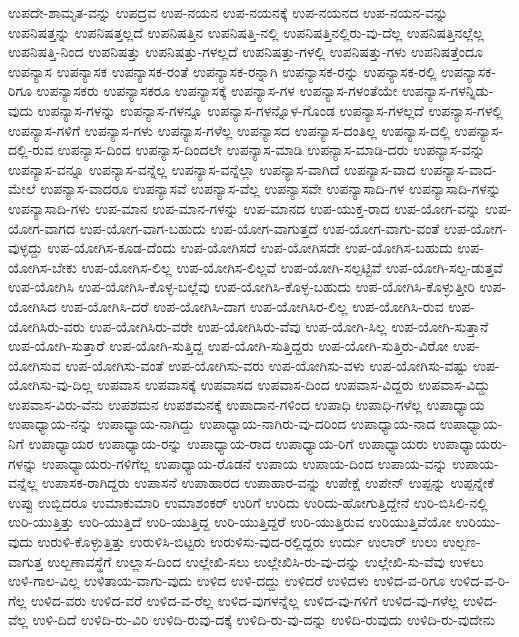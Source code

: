 {ಉಪದೇ-ಶಾಮೃತ-ವನ್ನು
ಉಪದ್ರವ
ಉಪ-ನಯನ
ಉಪ-ನಯನಕ್ಕೆ
ಉಪ-ನಯನದ
ಉಪ-ನಯನ-ವನ್ನು
ಉಪನಿಷತ್ತನ್ನು
ಉಪನಿಷತ್ತಲ್ಲದೆ
ಉಪನಿಷತ್ತಿನ
ಉಪನಿಷತ್ತಿ-ನಲ್ಲಿ
ಉಪನಿಷತ್ತಿನಲ್ಲಿರು-ವು-ದೆಲ್ಲ
ಉಪನಿಷತ್ತಿನಲ್ಲೆಲ್ಲ
ಉಪನಿಷತ್ತಿ-ನಿಂದ
ಉಪನಿಷತ್ತು
ಉಪನಿಷತ್ತು-ಗಳಲ್ಲದೆ
ಉಪನಿಷತ್ತು-ಗಳಲ್ಲಿ
ಉಪನಿಷತ್ತು-ಗಳು
ಉಪನಿಷತ್ತೆಂದೂ
ಉಪನ್ಯಾಸ
ಉಪನ್ಯಾಸಕ
ಉಪನ್ಯಾಸಕ-ರಂತೆ
ಉಪನ್ಯಾಸಕ-ರನ್ನಾಗಿ
ಉಪನ್ಯಾಸಕ-ರನ್ನು
ಉಪನ್ಯಾಸಕ-ರಲ್ಲಿ
ಉಪನ್ಯಾಸಕ-ರಿಗೂ
ಉಪನ್ಯಾಸಕರು
ಉಪನ್ಯಾಸಕರೂ
ಉಪನ್ಯಾಸಕ್ಕೆ
ಉಪನ್ಯಾಸ-ಗಳ
ಉಪನ್ಯಾಸ-ಗಳಂತೆಯೇ
ಉಪನ್ಯಾಸ-ಗಳನ್ನಿಡು-ವುದು
ಉಪನ್ಯಾಸ-ಗಳನ್ನು
ಉಪನ್ಯಾಸ-ಗಳನ್ನೂ
ಉಪನ್ಯಾಸ-ಗಳನ್ನೊಳ-ಗೊಂಡ
ಉಪನ್ಯಾಸ-ಗಳಲ್ಲದೆ
ಉಪನ್ಯಾಸ-ಗಳಲ್ಲಿ
ಉಪನ್ಯಾಸ-ಗಳಿಗೆ
ಉಪನ್ಯಾಸ-ಗಳು
ಉಪನ್ಯಾಸ-ಗಳೆಲ್ಲ
ಉಪನ್ಯಾಸದ
ಉಪನ್ಯಾಸ-ದಂತಿಲ್ಲ
ಉಪನ್ಯಾಸ-ದಲ್ಲಿ
ಉಪನ್ಯಾಸ-ದಲ್ಲಿ-ರುವ
ಉಪನ್ಯಾಸ-ದಿಂದ
ಉಪನ್ಯಾಸ-ದಿಂದಲೇ
ಉಪನ್ಯಾಸ-ಮಾಡಿ
ಉಪನ್ಯಾಸ-ಮಾಡಿ-ದರು
ಉಪನ್ಯಾಸ-ವನ್ನು
ಉಪನ್ಯಾಸ-ವನ್ನೂ
ಉಪನ್ಯಾಸ-ವನ್ನೆಲ್ಲ
ಉಪನ್ಯಾಸ-ವನ್ನೆಲ್ಲಾ
ಉಪನ್ಯಾಸ-ವಾಗಿದೆ
ಉಪನ್ಯಾಸ-ವಾದ
ಉಪನ್ಯಾಸ-ವಾದ-ಮೇಲೆ
ಉಪನ್ಯಾಸ-ವಾದರೂ
ಉಪನ್ಯಾಸವೆ
ಉಪನ್ಯಾಸ-ವೆಲ್ಲ
ಉಪನ್ಯಾಸವೇ
ಉಪನ್ಯಾಸಾದಿ-ಗಳ
ಉಪನ್ಯಾಸಾದಿ-ಗಳನ್ನು
ಉಪನ್ಯಾಸಾದಿ-ಗಳು
ಉಪ-ಮಾನ
ಉಪ-ಮಾನ-ಗಳನ್ನು
ಉಪ-ಮಾನದ
ಉಪ-ಯುಕ್ತ-ರಾದ
ಉಪ-ಯೋಗ-ವನ್ನು
ಉಪ-ಯೋಗ-ವಾಗದ
ಉಪ-ಯೋಗ-ವಾಗ-ಬಹುದು
ಉಪ-ಯೋಗ-ವಾಗುತ್ತದೆ
ಉಪ-ಯೋಗ-ವಾಗು-ವಂತೆ
ಉಪ-ಯೋಗ-ವುಳ್ಳದ್ದು
ಉಪ-ಯೋಗಿಸ-ಕೂಡ-ದೆಂದು
ಉಪ-ಯೋಗಿಸದೆ
ಉಪ-ಯೋಗಿಸದೇ
ಉಪ-ಯೋಗಿಸ-ಬಹುದು
ಉಪ-ಯೋಗಿಸ-ಬೇಕು
ಉಪ-ಯೋಗಿಸ-ಲಿಲ್ಲ
ಉಪ-ಯೋಗಿಸ-ಲಿಲ್ಲವೆ
ಉಪ-ಯೋಗಿ-ಸಲ್ಪಟ್ಟಿವೆ
ಉಪ-ಯೋಗಿ-ಸಲ್ಪ-ಡುತ್ತವೆ
ಉಪ-ಯೋಗಿಸಿ
ಉಪ-ಯೋಗಿಸಿ-ಕೊಳ್ಳ-ಬಲ್ಲೆವು
ಉಪ-ಯೋಗಿಸಿ-ಕೊಳ್ಳ-ಬಹುದು
ಉಪ-ಯೋಗಿಸಿ-ಕೊಳ್ಳುತ್ತೀರಿ
ಉಪ-ಯೋಗಿಸಿದ
ಉಪ-ಯೋಗಿಸಿ-ದರೆ
ಉಪ-ಯೋಗಿಸಿ-ದಾಗ
ಉಪ-ಯೋಗಿಸಿರ-ಲಿಲ್ಲ
ಉಪ-ಯೋಗಿಸಿ-ರುವ
ಉಪ-ಯೋಗಿಸಿರು-ವರು
ಉಪ-ಯೋಗಿಸಿರು-ವರೇ
ಉಪ-ಯೋಗಿಸಿರು-ವೆವು
ಉಪ-ಯೋಗಿ-ಸಿಲ್ಲ
ಉಪ-ಯೋಗಿ-ಸುತ್ತಾನೆ
ಉಪ-ಯೋಗಿ-ಸುತ್ತಾರೆ
ಉಪ-ಯೋಗಿ-ಸುತ್ತಿದ್ದ
ಉಪ-ಯೋಗಿ-ಸುತ್ತಿದ್ದರು
ಉಪ-ಯೋಗಿ-ಸುತ್ತಿರು-ವಿರೋ
ಉಪ-ಯೋಗಿಸುವ
ಉಪ-ಯೋಗಿಸು-ವಂತೆ
ಉಪ-ಯೋಗಿಸು-ವರು
ಉಪ-ಯೋಗಿಸು-ವಳು
ಉಪ-ಯೋಗಿಸು-ವಷ್ಟು
ಉಪ-ಯೋಗಿಸು-ವು-ದಿಲ್ಲ
ಉಪವಾಸ
ಉಪವಾಸಕ್ಕೆ
ಉಪವಾಸದ
ಉಪವಾಸ-ದಿಂದ
ಉಪವಾಸ-ವಿದ್ದರು
ಉಪವಾಸ-ವಿದ್ದು
ಉಪವಾಸ-ವಿರು-ವೆನು
ಉಪಶಮನ
ಉಪಶಮನಕ್ಕೆ
ಉಪಾದಾನ-ಗಳಿಂದ
ಉಪಾಧಿ
ಉಪಾಧಿ-ಗಳೆಲ್ಲ
ಉಪಾಧ್ಯಾಯ
ಉಪಾಧ್ಯಾಯ-ನನ್ನು
ಉಪಾಧ್ಯಾಯ-ನಾಗಿದ್ದು
ಉಪಾಧ್ಯಾಯ-ನಾಗಿರು-ವು-ದರಿಂದ
ಉಪಾಧ್ಯಾಯ-ನಾದ
ಉಪಾಧ್ಯಾಯ-ನಿಗೆ
ಉಪಾಧ್ಯಾಯರ
ಉಪಾಧ್ಯಾಯ-ರನ್ನು
ಉಪಾಧ್ಯಾಯ-ರಾದ
ಉಪಾಧ್ಯಾಯ-ರಿಗೆ
ಉಪಾಧ್ಯಾಯರು
ಉಪಾಧ್ಯಾಯರು-ಗಳನ್ನು
ಉಪಾಧ್ಯಾಯರು-ಗಳಿಗೆಲ್ಲ
ಉಪಾಧ್ಯಾಯ-ರೊಡನೆ
ಉಪಾಯ
ಉಪಾಯ-ದಿಂದ
ಉಪಾಯ-ವನ್ನು
ಉಪಾಯ-ವನ್ನೆಲ್ಲ
ಉಪಾಸಕ-ರಾಗಿದ್ದರು
ಉಪಾಸನೆ
ಉಪಾಹಾರದ
ಉಪಾಹಾರ-ವನ್ನು
ಉಪೇಕ್ಷೆ
ಉಪೇನ್
ಉಪ್ಪನ್ನು
ಉಪ್ಪನ್ನೇಕೆ
ಉಪ್ಪು
ಉಬ್ಬಿದರೂ
ಉಮಾಕುಮಾರಿ
ಉಮಾಶಂಕರ್
ಉರಿಗೆ
ಉರಿದು
ಉರಿದು-ಹೋಗುತ್ತಿದ್ದೇನೆ
ಉರಿ-ಬಿಸಿಲಿ-ನಲ್ಲಿ
ಉರಿ-ಯುತ್ತಿತ್ತು
ಉರಿ-ಯುತ್ತಿದೆ
ಉರಿ-ಯುತ್ತಿದ್ದ
ಉರಿ-ಯುತ್ತಿದ್ದರೆ
ಉರಿ-ಯುತ್ತಿರುವ
ಉರಿಯುತ್ತಿವೆಯೋ
ಉರಿಯು-ವುದು
ಉರುಳಿ-ಕೊಳ್ಳುತ್ತಿತ್ತು
ಉರುಳಿಸಿ-ಬಿಟ್ಟರು
ಉರುಳಿಸು-ವುದ-ರಲ್ಲಿದ್ದರು
ಉರ್ದು
ಉಲಾರ್
ಉಲು
ಉಲ್ಬಣ-ವಾಗುತ್ತ
ಉಲ್ಬಣಾವಸ್ಥೆಗೆ
ಉಲ್ಲಾಸ-ದಿಂದ
ಉಲ್ಲೇಖಿ-ಸಲು
ಉಲ್ಲೇಖಿಸಿ-ರು-ವು-ದನ್ನು
ಉಲ್ಲೇಖಿ-ಸು-ವೆವು
ಉಳಲು
ಉಳಿ-ಗಾಲ-ವಿಲ್ಲ
ಉಳಿತಾಯ-ವಾಗು-ವುದು
ಉಳಿದ
ಉಳಿ-ದದ್ದು
ಉಳಿದರೆ
ಉಳಿದಳು
ಉಳಿದ-ವ-ರಿಗೂ
ಉಳಿದ-ವ-ರಿ-ಗೆಲ್ಲ
ಉಳಿದ-ವರು
ಉಳಿದ-ವರೆ
ಉಳಿದ-ವ-ರೆಲ್ಲ
ಉಳಿದ-ವುಗಳನ್ನೆಲ್ಲ
ಉಳಿದ-ವು-ಗಳಿಗೆ
ಉಳಿದ-ವು-ಗಳೆಲ್ಲ
ಉಳಿದ-ವೆಲ್ಲ
ಉಳಿ-ದಿದೆ
ಉಳಿದಿ-ರು-ವಿರಿ
ಉಳಿದಿ-ರುವು-ದಕ್ಕೆ
ಉಳಿದಿ-ರು-ವು-ದನ್ನು
ಉಳಿದಿ-ರುವುದು
ಉಳಿದಿ-ರು-ವುದೇನು
}
